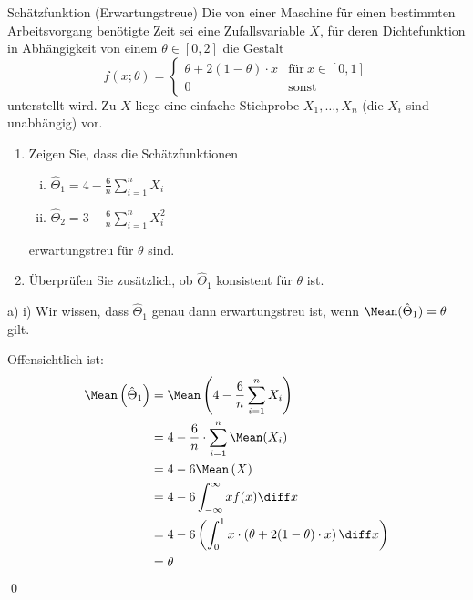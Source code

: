 \begin{example}{Schätzfunktion (Erwartungstreue)}
    Die von einer Maschine für einen bestimmten Arbeitsvorgang benötigte Zeit sei eine Zufallsvariable $X$, für deren Dichtefunktion in Abhängigkeit von einem $\theta \in [0, 2]$ die Gestalt
    \[
        f(x;\theta) =
        \begin{cases}
            \theta + 2(1-\theta)\cdot x & \text{für} \ x \in [0,1] \\
            0                           & \text{sonst}
        \end{cases}
    \]
    unterstellt wird.
    Zu $X$ liege eine einfache Stichprobe $X_1, \ldots , X_n$ (die $X_i$ sind unabhängig) vor.\

    \begin{enumerate}[\alph*)]
        \item Zeigen Sie, dass die Schätzfunktionen
              \begin{enumerate}[i)]
                  \item $\hat{\Theta}_1 = 4 - \frac{6}{n} \sum_{i=1}^{n} X_i$
                  \item $\hat{\Theta}_2 = 3 - \frac{6}{n} \sum_{i=1}^{n} X_i^2$
              \end{enumerate}
              erwartungstreu für $\theta$ sind.
        \item Überprüfen Sie zusätzlich, ob $\hat{\Theta}_1$ konsistent für $\theta$ ist.
    \end{enumerate}

    \exampleseparator

    a) i) Wir wissen, dass $\hat{\Theta}_1$ genau dann erwartungstreu ist, wenn $\Mean(\hat{\Theta}_1) = \theta$ gilt.

    Offensichtlich ist:
    \begin{alignat*}{1}
        \Mean\left( \hat{\Theta}_1 \right) & = \Mean\left( 4 - \frac{6}{n} \sum_{i=1}^{n} X_i \right)                                       \\
                                           & = 4 - \frac{6}{n} \cdot \sum_{i=1}^{n}  \Mean (X_i)                                            \\
                                           & = 4 - 6 \Mean\left( X \right)                                                                  \\
                                           & = 4 - 6 \int_{-\infty}^{\infty} xf(x) \diff x                                                  \\
                                           & = 4 - 6 \left(  \int_{0}^{1} x\cdot \left( \theta + 2(1-\theta)\cdot x \right) \diff x \right) \\
                                           & = \theta
    \end{alignat*}
    \qed


\end{example}
